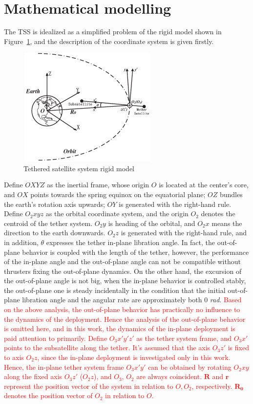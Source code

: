 \documentclass[3p]{elsarticle}
\theoremstyle{plain}
\begin{document}
\section{Mathematical modelling}\label{sec:mm}
The TSS is idealized as a simplified problem of the rigid model shown in Figure~\ref{fig:model}, and the description of the coordinate system is given firstly.
\begin{figure}
\centering
\includegraphics[width=6.94cm,height=5.87cm]{orbit_in_plane.eps}
\caption{Tethered satellite system rigid model}\label{fig:model}
\end{figure}
Define $OXYZ$ as the inertial frame, whose origin $O$ is located at the center's core, and $OX$ points towards the spring equinox on the equatorial plane; $OZ$ bundles the earth's rotation axis upwards; $OY$ is generated with the right-hand rule.
Define $O_2xyz$ as the orbital coordinate system, and the origin $O_2$ denotes the centroid of the tether system. $O_2y$ is heading of the orbital, and $O_2x$ means the direction to the earth downwards. $O_2z$ is generated with the right-hand rule, and in addition, $\theta$ expresses the tether in-plane libration angle. In fact, the out-of-plane behavior is coupled with the length of the tether, however, the performance of the in-plane angle and the  out-of-plane angle can not be compatible without thrusters fixing the out-of-plane dynamics\cite{Vadali1991Feedback}. On the other hand, the excursion of the out-of-plane angle is not big, when the in-plane behavior is controlled stably, the out-of-plane one is steady incidentally in the condition that the initial out-of-plane libration angle and the angular rate are approximately both 0 \textit{rad}. \textcolor{red}{Based on the above analysis, the out-of-plane behavior has practically no influence to the dynamics of the deployment. Hence the analysis of the out-of-plane behavior is omitted here, and in this work, the dynamics of the in-plane deployment is paid attention to primarily. Define $O_3x'y'z'$ as the tether system frame, and $O_3x'$ points to the subsatellite along the tether. It's assumed that the axis $O_3z'$ is fixed to axis $O_2z$, since the in-plane deployment is investigated only in this work. Hence, the in-plane tether system frame $O_3x'y'$ can be obtained by rotating $O_2xy$ along the fixed axis $O_3z'$ ($O_2z$), and $O_3$, $O_2$ are always coincident. $\bm{R}$ and $\bm{r}$ represent the position vector of the system in relation to $O,O_2$, respectively. $\bm{R_0}$ denotes the position vector of $O_2$ in relation to $O$.}\par
\end{document}
